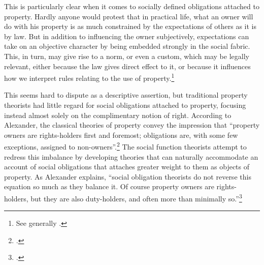 This is particularly clear when it comes to socially defined obligations attached to property. Hardly anyone would protest that in practical life, what an owner will do with his property is as much constrained by the expectations of others as it is by law. But in addition to influencing the owner subjectively, expectations can take on an objective character by being embedded strongly in the social fabric. This, in turn, may give rise to a norm, or even a custom, which may be legally relevant, either because the law gives direct effect to it, or because it influences how we interpret rules relating to the use of property.\footnote{See generally \cite{penalver09,alexander09}.}

This seems hard to dispute as a descriptive assertion, but traditional property theorists had little regard for social obligations attached to property, focusing instead almost solely on the complimentary notion of right. According to Alexander, the classical theories of property convey the impression that ``property owners are rights-holders first and foremost; obligations are, with some few exceptions, assigned to non-owners''.\footcite[1023]{alexander11} The social function theorists attempt to redress this imbalance by developing theories that can naturally accommodate an account of social obligations that attaches greater weight to them as objects of property. As Alexander explains, ``social obligation theorists do not reverse this equation so much as they balance it. Of course property owners are rights-holders, but they are also duty-holders, and often more than minimally so.''\footcite[1023]{alexander11} 

